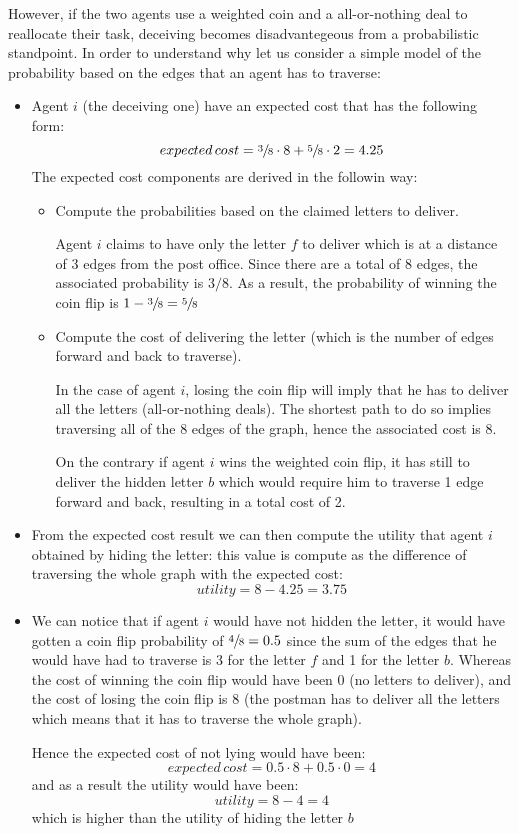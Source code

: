 However, if the two agents use a weighted coin and a all-or-nothing deal to reallocate their task, deceiving becomes disadvantegeous from a probabilistic standpoint. 
In order to understand why let us consider a simple model of the probability based on the edges that an agent has to traverse:
\begin{itemize}
\item Agent $i$ (the deceiving one) have an expected cost that has the following form:
\[expected\,cost = \sfrac{3}{8}\cdot 8 + \sfrac{5}{8}\cdot2 = 4.25\]
The expected cost components are derived in the followin way:
\begin{itemize}
\item Compute the probabilities based on the claimed letters to deliver.

Agent $i$ claims to have only the letter $f$ to deliver which is at a distance of 3 edges from the post office. Since there are a total of 8 edges, the associated probability is $3/8$. As a result, the probability of winning the coin flip is $1-\sfrac{3}{8} = \sfrac{5}{8}$
\item Compute the cost of delivering the letter (which is the number of edges forward and back to traverse).

In the case of agent $i$, losing the coin flip will imply that he has to deliver all the letters (all-or-nothing deals). The shortest path to do so implies traversing all of the 8 edges of the graph, hence the associated cost is 8.

On the contrary if agent $i$ wins the weighted coin flip, it has still to deliver the hidden letter $b$ which would require him to traverse 1 edge forward and back, resulting in a total cost of 2.
 
\end{itemize}
\item From the expected cost result we can then compute the utility that agent $i$ obtained by hiding the letter: this value is compute as the difference of traversing the whole graph with the expected cost:
\[utility = 8-4.25 = 3.75\]
\item We can notice that if agent $i$ would have not hidden the letter, it would have gotten a coin flip probability of $\sfrac{4}{8}= 0.5$ since the sum of the edges that he would have had to traverse is 3 for the letter $f$ and 1 for the letter $b$.
Whereas the cost of winning the coin flip would have been 0 (no letters to deliver), and the cost of losing the coin flip is 8 (the postman has to deliver all the letters which means that it has to traverse the whole graph).

Hence the expected cost of not lying would have been:
\[expected\,cost = 0.5 \cdot 8 + 0.5\cdot 0 = 4\]
and as a result the utility would have been:
\[utility = 8-4 = 4\]
which is higher than the utility of hiding the letter $b$
\end{itemize}

